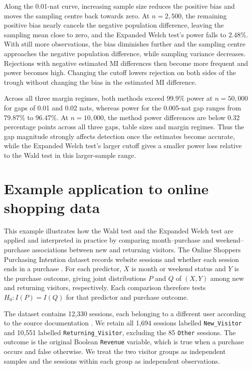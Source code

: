 Along the 0.01-nat curve, increasing sample size reduces the positive
bias and moves the sampling centre back towards zero. At \(n=2{,}500\), the remaining positive
bias nearly cancels the negative population difference, leaving the
sampling mean close to zero, and the Expanded Welch test's power falls to 2.48\%.
With still more observations, the bias diminishes further and the
sampling centre approaches the negative population difference, while
sampling variance decreases. Rejections with negative estimated MI differences then become more frequent
and power becomes high. Changing the cutoff lowers rejection on both sides
of the trough without changing the bias in the estimated MI difference.

Across all three margin regimes, both methods exceed 99.9\% power at
\(n=50{,}000\) for gaps of 0.01 and 0.02 nats, whereas power for the
0.005-nat gap ranges from 79.87\% to 96.47\%. At \(n=10{,}000\),
the method power differences are below 0.32 percentage points across all
three gaps, table sizes and margin regimes. Thus the gap magnitude strongly
affects detection once the estimates become accurate, while the Expanded Welch test's larger cutoff gives a smaller power loss
relative to the Wald test in this
larger-sample range.

\section{Example application to online shopping data}
\label{sec:shoppers-application}

This example illustrates how the Wald test and the Expanded Welch test are applied
and interpreted in practice by comparing month--purchase and
weekend--purchase associations between new and returning visitors.
The Online Shoppers Purchasing Intention dataset records website sessions
and whether each session ends in a purchase \citep{sakar2018}. For each predictor,
\(X\) is month or weekend status and \(Y\) is the purchase outcome,
giving joint distributions \(P\) and \(Q\) of \((X,Y)\) among new
and returning visitors, respectively. Each comparison therefore tests
\(H_0:I(P)=I(Q)\) for that predictor and purchase outcome.

The dataset contains 12,330 sessions, each belonging to a different user
according to the source documentation \citep{sakar2018}. We retain all
1,694 sessions labelled \texttt{New\_Visitor} and 10,551 labelled
\texttt{Returning\_Visitor}, excluding the 85 \texttt{Other} sessions.
The outcome is the original Boolean \texttt{Revenue} variable, which is
true when a purchase occurs and false otherwise. We treat the two visitor
groups as independent samples and the sessions within each group as
independent observations.

